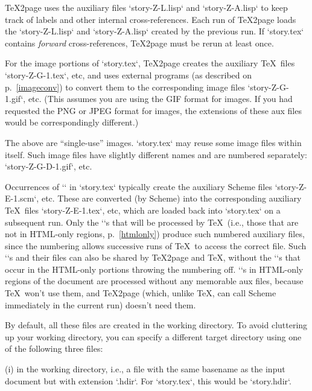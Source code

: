 \TeX2page uses the auxiliary files `story-Z-L.lisp` and
`story-Z-A.lisp` to keep track of labels and other
internal cross-references.  Each run of \TeX2page loads
the `story-Z-L.lisp` and `story-Z-A.lisp`
created by the previous run.  If `story.tex` contains
{\em forward} cross-references, \TeX2page must be rerun
at least once.

For the image portions of `story.tex`, \TeX2page creates the auxiliary \TeX\
files `story-Z-G-1.tex`, etc, and uses external programs (as described on
p.~\ref{imageconv}) to convert them to the corresponding image files
`story-Z-G-1.gif`, etc.  (This assumes you are using the GIF format for
images.  If you had requested the PNG or JPEG format for images, the
extensions of these aux files would be correspondingly different.)

The above are “single-use” images.
`story.tex` may reuse some image files within itself.
Such image files have slightly different names and are
numbered separately: `story-Z-G-D-1.gif`, etc.


Occurrences of `\eval` in `story.tex` typically
create the auxiliary Scheme files `story-Z-E-1.scm`,
etc.  These are converted (by Scheme) into the
corresponding auxiliary \TeX\ files `story-Z-E-1.tex`,
etc, which are loaded back into `story.tex` on a
subsequent run.  Only the `\eval`s that will be
processed by \TeX\ (i.e., those that are not in
HTML-only regions, p.~\ref{htmlonly})
produce such numbered auxiliary files,
since the numbering allows successive runs of \TeX\ to
access the correct file.  Such `\eval`s and their
files can also be shared by \TeX2page and \TeX, without
the `\eval`s that occur in the HTML-only portions
throwing the numbering off.  `\eval`s in
HTML-only
regions of the document are processed
without any memorable aux files, because \TeX\ won’t use
them, and \TeX2page (which, unlike \TeX, can call Scheme
immediately in the
current run) doesn’t need them.


By default, all these files are created in the working
directory.  To avoid cluttering up
your working directory, you can specify a different target directory
using one of the following three files:

\item(i)  in the working directory, i.e.,
a file with the same basename as the input document but with
extension `.hdir`.  For `story.tex`, this would
be `story.hdir`.

